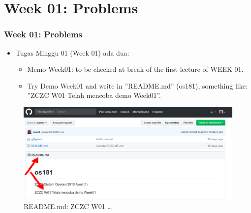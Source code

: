 \documentclass[xcolor=table, notheorems, hyperref={pdfpagelabels=false}]{beamer}
\begin{document}
\section{Week 01: Problems}
\begin{frame}
\frametitle{Week 01: Problems}
\begin{itemize}
\item Tugas Minggu 01 (Week 01) ada dua:
\begin{itemize}
\item Memo Week01: to be checked  at break of the first lecture of WEEK 01.
\item Try Demo Week01 and write in ''README.md'' (os181), something like:
                 ''ZCZC W01 Telah mencoba demo Week01''.
\end{itemize}
\end{itemize}

\begin{figure}
\includegraphics[width=0.85\linewidth]{os01-README}
\caption{README.md: ZCZC W01 \dots}
\end{figure}

\end{frame}


\end{document}
